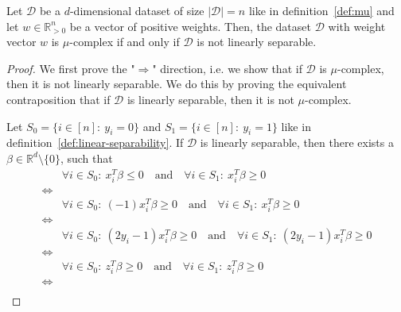 \begin{theorem}
    \label{theorem:mu-linear-separability}
    Let $\mathcal{D}$ be a $d$-dimensional dataset of size
    $|\mathcal{D}| = n$ like in definition~\ref{def:mu}
    and let $w \in \mathbb{R}^n_{>0}$ be a vector of
    positive weights.
    Then, the dataset
    $\mathcal{D}$ with weight vector $w$ is $\mu$-complex
    if and only if $\mathcal{D}$ is not linearly separable.
\end{theorem}
\begin{proof}
    We first prove the "$\Rightarrow$" direction, i.e. we show
    that if $\mathcal{D}$ is $\mu$-complex,
    then it is not linearly separable.
    We do this by proving the equivalent
    contraposition that if $\mathcal{D}$ is linearly separable,
    then it is not $\mu$-complex.

    Let $S_0 = \{i \in [n]:\ y_i = 0\}$ and $S_1 = \{i \in [n]:\ y_i = 1\}$
    like in definition~\ref{def:linear-separability}.
    If $\mathcal{D}$ is linearly separable, then there exists
    a $\beta \in \mathbb{R}^d \setminus \{0\}$, such that
    \begin{align*}
                    & \forall i \in S_0:\ x_i^T \beta \leq 0\quad \text{and}\quad \forall i \in S_1:\ x_i^T \beta \geq 0                       \\
        \iff        &                                                                                                                          \\
                    & \forall i \in S_0:\ (-1) x_i^T \beta \geq 0\quad \text{and}\quad \forall i \in S_1:\ x_i^T \beta \geq 0                  \\
        \iff        &                                                                                                                          \\
                    & \forall i \in S_0:\ (2y_i - 1) x_i^T \beta \geq 0\quad \text{and}\quad \forall i \in S_1:\ (2y_i - 1) x_i^T \beta \geq 0 \\
        \iff        &                                                                                                                          \\
                    & \forall i \in S_0:\ z_i^T \beta \geq 0\quad \text{and}\quad \forall i \in S_1:\ z_i^T \beta \geq 0                       \\
        \iff        &                                                                                                                          \\

\end{align*}
\end{proof}
